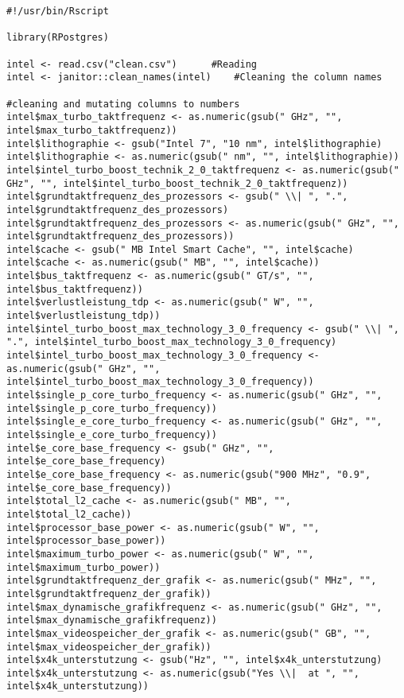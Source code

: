 \begin{lstlisting}[caption={\texttt{database.R}},captionpos=b]
#!/usr/bin/Rscript

library(RPostgres)

intel <- read.csv("clean.csv")		#Reading
intel <- janitor::clean_names(intel)	#Cleaning the column names

#cleaning and mutating columns to numbers
intel$max_turbo_taktfrequenz <- as.numeric(gsub(" GHz", "", intel$max_turbo_taktfrequenz))
intel$lithographie <- gsub("Intel 7", "10 nm", intel$lithographie)
intel$lithographie <- as.numeric(gsub(" nm", "", intel$lithographie))
intel$intel_turbo_boost_technik_2_0_taktfrequenz <- as.numeric(gsub(" GHz", "", intel$intel_turbo_boost_technik_2_0_taktfrequenz))
intel$grundtaktfrequenz_des_prozessors <- gsub(" \\| ", ".", intel$grundtaktfrequenz_des_prozessors)
intel$grundtaktfrequenz_des_prozessors <- as.numeric(gsub(" GHz", "", intel$grundtaktfrequenz_des_prozessors))
intel$cache <- gsub(" MB Intel Smart Cache", "", intel$cache)
intel$cache <- as.numeric(gsub(" MB", "", intel$cache))
intel$bus_taktfrequenz <- as.numeric(gsub(" GT/s", "", intel$bus_taktfrequenz))
intel$verlustleistung_tdp <- as.numeric(gsub(" W", "", intel$verlustleistung_tdp))
intel$intel_turbo_boost_max_technology_3_0_frequency <- gsub(" \\| ", ".", intel$intel_turbo_boost_max_technology_3_0_frequency)
intel$intel_turbo_boost_max_technology_3_0_frequency <- as.numeric(gsub(" GHz", "", intel$intel_turbo_boost_max_technology_3_0_frequency))
intel$single_p_core_turbo_frequency <- as.numeric(gsub(" GHz", "", intel$single_p_core_turbo_frequency))
intel$single_e_core_turbo_frequency <- as.numeric(gsub(" GHz", "", intel$single_e_core_turbo_frequency))
intel$e_core_base_frequency <- gsub(" GHz", "", intel$e_core_base_frequency)
intel$e_core_base_frequency <- as.numeric(gsub("900 MHz", "0.9", intel$e_core_base_frequency))
intel$total_l2_cache <- as.numeric(gsub(" MB", "", intel$total_l2_cache))
intel$processor_base_power <- as.numeric(gsub(" W", "", intel$processor_base_power))
intel$maximum_turbo_power <- as.numeric(gsub(" W", "", intel$maximum_turbo_power))
intel$grundtaktfrequenz_der_grafik <- as.numeric(gsub(" MHz", "", intel$grundtaktfrequenz_der_grafik))
intel$max_dynamische_grafikfrequenz <- as.numeric(gsub(" GHz", "", intel$max_dynamische_grafikfrequenz))
intel$max_videospeicher_der_grafik <- as.numeric(gsub(" GB", "", intel$max_videospeicher_der_grafik))
intel$x4k_unterstutzung <- gsub("Hz", "", intel$x4k_unterstutzung)
intel$x4k_unterstutzung <- as.numeric(gsub("Yes \\|  at ", "", intel$x4k_unterstutzung))



\end{lstlisting}
